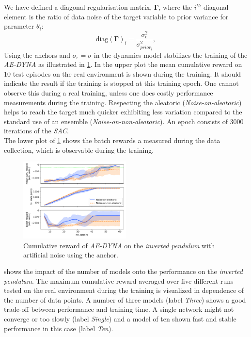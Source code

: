 \documentclass[
reprint,
amsmath,amssymb,amsfonts,clevref,
aps,
prstab,
]{revtex4-2}
\begin{document}
We have defined a diagonal regularisation matrix, $\pmb{\Gamma}$, where the $i^{th}$ diagonal element is the ratio of data noise of the target variable to prior variance for parameter $\theta_i$:
\begin{equation}
	\label{eqn_anch_loss_init}
	\text{diag}(\pmb{\Gamma})_i = \frac{\sigma^2_\epsilon}{\sigma^2_{prior_i}},
\end{equation}
	Using the anchors and $\sigma_\epsilon=\sigma$ in the dynamics model stabilizes the training of the \emph{AE-DYNA} as illustrated in \cref{fig:comparsion_noise_ae_dyna}. In the upper plot the mean cumulative reward on 10 test episodes on the real environment is shown during the training. It should indicate the result if the training is stopped at this training epoch. One cannot observe this during a real training, unless one does costly performance measurements during the training. Respecting the aleatoric (\emph{Noise-on-aleatoric}) helps to reach the target much quicker exhibiting less variation compared to the standard use of an ensemble (\emph{Noise-on-non-aleatoric}). An epoch consists of 3000 iterations of the \emph{SAC}.\\
	The lower plot of \cref{fig:comparsion_noise_ae_dyna} shows the batch rewards a measured during the data collection, which is observable during the training.
	\begin{figure}[!h]
		\centering
		\includegraphics*[width=0.5\textwidth]{Figures/Comparison_noise_ae_dyna}
		\caption{Cumulative reward of \emph{AE-DYNA} on the \emph{inverted pendulum} with artificial noise using the anchor.}
		\label{fig:comparsion_noise_ae_dyna}
	\end{figure}
 shows the impact of the number of models onto the performance on the \emph{inverted pendulum}. The maximum cumulative reward averaged over five different runs tested on the real environment during the training is visualized in dependence of the number of data points. A number of three models (label \emph{Three}) shows a good trade-off between performance and training time. A single network might not converge or too slowly (label \emph{Single}) and a model of ten shown fast and stable performance in this case (label \emph{Ten}).
\end{document}
